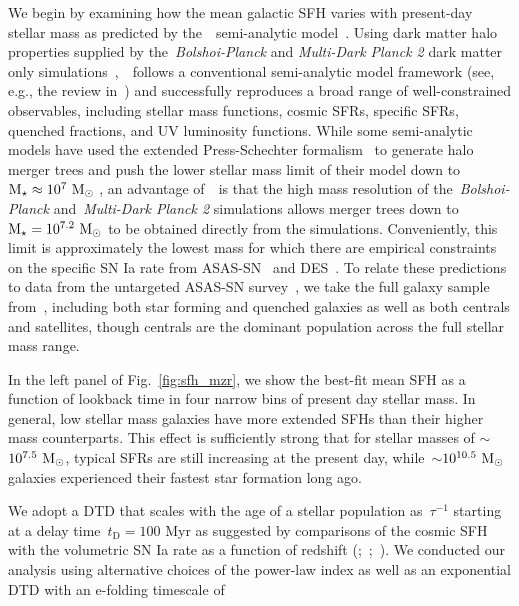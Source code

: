 \documentclass[foo.tex]{subfiles}
\begin{document}
We begin by examining how the mean galactic SFH varies with present-day stellar
mass as predicted by the~\um~semi-analytic model~\citep{Behroozi2019}.
Using dark matter halo properties supplied by the~\textit{Bolshoi-Planck} and
\textit{Multi-Dark Planck 2} dark matter only simulations~\citep{Klypin2016,
RodriguezPuebla2016},~\um~follows a conventional semi-analytic model framework
(see, e.g., the review in~\citealt{Somerville2015a}) and successfully
reproduces a broad range of well-constrained observables, including stellar
mass functions, cosmic SFRs, specific SFRs, quenched fractions, and UV
luminosity functions.
While some semi-analytic models have used the extended Press-Schechter
formalism~\citep{Press1974, Bond1991} to generate halo merger trees and push
the lower stellar mass limit of their model down to~$\text{M}_\star \approx 10^7~\text{M}_\odot$
\citep[e.g.][]{Somerville2015b}, an advantage of~\um~is that the high mass
resolution of the~\textit{Bolshoi-Planck} and~\textit{Multi-Dark Planck 2}
simulations allows merger trees down to~$\text{M}_\star = 10^{7.2}~\text{M}_\odot$ to be
obtained directly from the simulations.
Conveniently, this limit is approximately the lowest mass for which there are
empirical constraints on the specific SN Ia rate from ASAS-SN~\citep{Brown2019}
and DES~\citep{Wiseman2021}.
To relate these predictions to data from the untargeted ASAS-SN
survey~\citep{Shappee2014, Kochanek2017}, we take the full galaxy
sample from~\um, including both star forming and quenched galaxies as
well as both centrals and satellites, though centrals are the dominant
population across the full stellar mass range.
\par
In the left panel of Fig.~\ref{fig:sfh_mzr}, we show the best-fit mean SFH as a
function of lookback time in four narrow bins of present day stellar mass.
In general, low stellar mass galaxies have more extended SFHs than their
higher mass counterparts.
This effect is sufficiently strong that for stellar masses of
$\sim$$10^{7.5}~\text{M}_\odot$, typical SFRs are still increasing at the present day,
while~$\sim$$10^{10.5}~\text{M}_\odot$ galaxies experienced their fastest star formation
long ago.
\par
We adopt a DTD that scales with the age of a stellar population as~$\tau^{-1}$
starting at a delay time~$t_\text{D} = 100$ Myr as suggested by comparisons of
the cosmic SFH with the volumetric SN Ia rate as a function of redshift
(\citealp{Maoz2012a};~\citealp*{Maoz2012b};~\citealp{Graur2013, Graur2014}).
We conducted our analysis using alternative choices of the power-law
index as well as an exponential DTD with an e-folding timescale of
\end{document}
